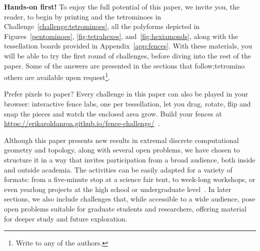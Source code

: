 \documentclass{amsart}
\theoremstyle{definition}
\theoremstyle{remark}
\begin{document}
	\noindent \textbf{Hands-on first!} To enjoy the full potential of this paper, we invite you, the reader, to begin by printing and \hspace{0.2em}\ScissorRight\hspace{0.2em} the tetrominoes in Challenge~\ref{challenge:tetrominoes}, all the polyforms depicted in Figures~\ref{pentominoes}, \ref{fig:tetrahexes}, and~\ref{fig:hexiamonds}, along with the tessellation boards provided in Appendix~\ref{app:fences}.
	With these materials, you will be able to try the first round of challenges, before diving into the rest of the paper. Some of the answers are presented in the sections that follow;tetromino others are available upon request\footnote{Write to any of the authors.}.\medskip
	
	Prefer pixels to paper? Every challenge in this paper can also be
	played in your browser: interactive fence labs, one per tessellation,
	let you drag, rotate, flip and snap the pieces and watch the enclosed
	area grow. Build your fences at \url{https://erikaroldanroa.github.io/fence-challenge/}~\cite{FenceHub}.\medskip
	
	
	
	Although this paper presents new results in extremal discrete computational geometry and topology, along with several open problems, we have chosen to structure it in a way that invites participation from a broad audience, both inside and outside academia. The activities can be easily adapted for a variety of formats: from a five-minute stop at a science fair tent, to week-long workshops, or even yearlong projects at the high school or undergraduate level~\cite{LRRR24}. In later sections, we also include challenges that, while accessible to a wide audience, pose open problems suitable for graduate students and researchers, offering material for deeper study and future exploration.
				
\end{document}
